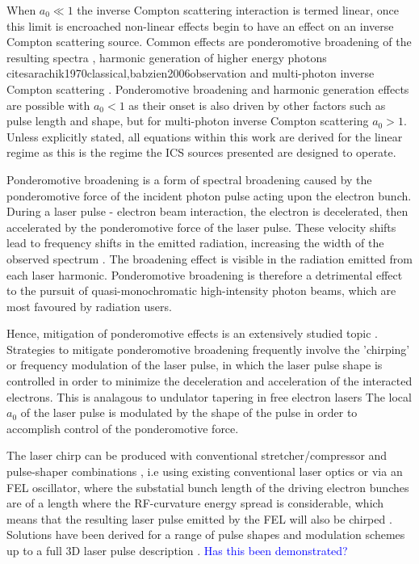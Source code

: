 \documentclass[../main.tex]{subfiles}
\begin{document}
When $a_{0} \ll 1$ the inverse Compton scattering interaction is termed linear, once this limit is encroached non-linear effects begin to have an effect on an inverse Compton scattering source. Common effects are ponderomotive broadening of the resulting spectra \cite{krafft2004spectral}, harmonic generation of higher energy photons cite{sarachik1970classical,babzien2006observation} and multi-photon inverse Compton scattering \cite{bula1996observation}. Ponderomotive broadening and harmonic generation effects are possible with $a_{0}<1$ as their onset is also driven by other factors such as pulse length and shape, but for multi-photon inverse Compton scattering $a_{0}>1$. Unless explicitly stated, all equations within this work are derived for the linear regime as this is the regime the ICS sources presented are designed to operate.

Ponderomotive broadening is a form of spectral broadening caused by the ponderomotive force of the incident photon pulse acting upon the electron bunch. During a laser pulse - electron beam interaction, the electron is decelerated, then accelerated by the ponderomotive force of the laser
pulse. These velocity shifts lead to frequency shifts in the
emitted radiation, increasing the width of the observed
spectrum \cite{krafft2004spectral}. The broadening effect is visible in the radiation emitted from each laser harmonic. Ponderomotive broadening is therefore a detrimental effect to the pursuit of quasi-monochromatic high-intensity photon beams, which are most favoured by radiation users. 

Hence, mitigation of ponderomotive effects is an extensively studied topic \cite{ghebregziabher2013spectral,terzic2014narrow,seipt2015narrowband,rykovanov2016controlling,terzic2016combining,terzic2019improving}. Strategies to mitigate ponderomotive broadening frequently involve the 'chirping' or frequency modulation of the laser pulse, in which the laser pulse shape is controlled in order to minimize the deceleration and acceleration of the interacted electrons. This is analagous to undulator tapering in free electron lasers The local $a_{0}$ of the laser pulse is modulated by the shape of the pulse in order to accomplish control of the ponderomotive force. 

The laser chirp can be produced with conventional stretcher/compressor and pulse-shaper combinations \cite{ghebregziabher2013spectral}, i.e using existing conventional laser optics or via an FEL oscillator, where the substatial bunch length of the driving electron bunches are of a length where the RF-curvature energy spread is considerable, which means that the resulting laser pulse emitted by the FEL will
also be chirped \cite{terzic2014narrow}. Solutions have been derived for a range of pulse shapes and modulation schemes up to a full 3D laser pulse description \cite{terzic2019improving}. \textcolor{blue}{Has this been demonstrated?}
\end{document}
